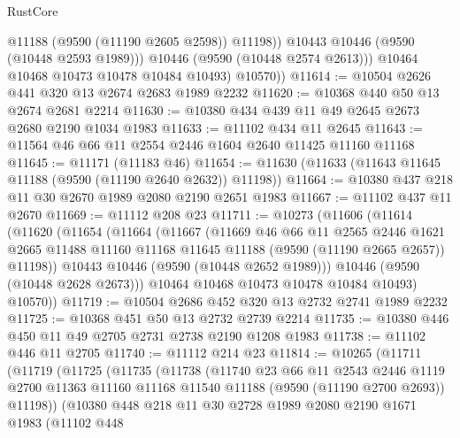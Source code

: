 \begin{lexlean}{RustCore}
\begin{coremodule}
                  @11188
                  (@9590 (@11190 @2605 @2598))
                  @11198))
              @10443
              @10446
              (@9590 (@10448 @2593 @1989)))
            @10446
            (@9590 (@10448 @2574 @2613)))
          @10464
          @10468
          @10473
          @10478
          @10484
          @10493)
        @10570))
@11614 := @10504 @2626 @441 @320 @13 @2674 @2683 @1989 @2232
@11620 := @10368 @440 @50 @13 @2674 @2681 @2214
@11630 := @10380 @434 @439 @11 @49 @2645 @2673 @2680 @2190 @1034 @1983
@11633 := @11102 @434 @11 @2645
@11643 := @11564 @46 @66 @11 @2554 @2446 @1604 @2640 @11425 @11160 @11168
@11645 := @11171 (@11183 @46)
@11654 := @11630 (@11633 (@11643 @11645 @11188 (@9590 (@11190 @2640 @2632)) @11198))
@11664 := @10380 @437 @218 @11 @30 @2670 @1989 @2080 @2190 @2651 @1983
@11667 := @11102 @437 @11 @2670
@11669 := @11112 @208 @23
@11711 := @10273
    (@11606
      (@11614
        (@11620
          (@11654
            (@11664
              (@11667
                (@11669
                  @46
                  @66
                  @11
                  @2565
                  @2446
                  @1621
                  @2665
                  @11488
                  @11160
                  @11168
                  @11645
                  @11188
                  (@9590 (@11190 @2665 @2657))
                  @11198))
              @10443
              @10446
              (@9590 (@10448 @2652 @1989)))
            @10446
            (@9590 (@10448 @2628 @2673)))
          @10464
          @10468
          @10473
          @10478
          @10484
          @10493)
        @10570))
@11719 := @10504 @2686 @452 @320 @13 @2732 @2741 @1989 @2232
@11725 := @10368 @451 @50 @13 @2732 @2739 @2214
@11735 := @10380 @446 @450 @11 @49 @2705 @2731 @2738 @2190 @1208 @1983
@11738 := @11102 @446 @11 @2705
@11740 := @11112 @214 @23
@11814 := @10265
    (@11711
      (@11719
        (@11725
          (@11735
            (@11738
              (@11740
                @23
                @66
                @11
                @2543
                @2446
                @1119
                @2700
                @11363
                @11160
                @11168
                @11540
                @11188
                (@9590 (@11190 @2700 @2693))
                @11198))
            (@10380
              @448
              @218
              @11
              @30
              @2728
              @1989
              @2080
              @2190
              @1671
              @1983
              (@11102
                @448

\end{coremodule}
\end{lexlean}
